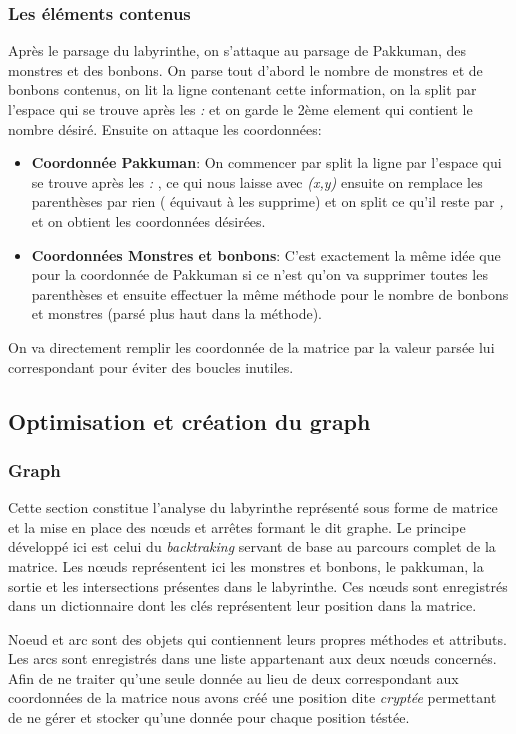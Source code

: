 \documentclass[12pt, oneside]{article}
\begin{document}
\subsubsection{Les éléments contenus}
Après le parsage du labyrinthe, on s'attaque au parsage de Pakkuman, des monstres et des bonbons.
On parse tout d'abord le nombre de monstres et de bonbons contenus, on lit la ligne contenant cette information, on la split par l'espace qui se trouve après les \emph{:} et on garde le 2ème element qui contient le nombre désiré.
Ensuite on attaque les coordonnées:

\begin{itemize}
\item 
\textbf{Coordonnée Pakkuman}: On commencer par split la ligne par l'espace qui se trouve après les \emph{:} , ce qui nous laisse avec \emph{(x,y)} ensuite on remplace les parenthèses par rien ( équivaut à les supprime) et on split ce qu'il reste par \emph{,} et on obtient les coordonnées désirées.
\item
\textbf{Coordonnées Monstres et bonbons}: C'est exactement la même idée que pour la coordonnée de Pakkuman si ce n'est qu'on va supprimer toutes les parenthèses et ensuite effectuer la même méthode pour le nombre de bonbons et monstres (parsé plus haut dans la méthode).

\end{itemize}
On va directement remplir les coordonnée de la matrice par la valeur parsée lui correspondant pour éviter des boucles inutiles.

\subsection{Optimisation et création du graph}
\subsubsection{Graph}
Cette section constitue l’analyse du labyrinthe représenté sous forme de matrice et la mise en place des nœuds et arrêtes formant le dit graphe.
Le principe développé ici est celui du \emph{backtraking}  servant de base au parcours complet de la matrice. Les nœuds représentent ici les monstres et bonbons, le pakkuman, la sortie et les intersections présentes dans le labyrinthe. Ces nœuds sont enregistrés dans un dictionnaire dont les clés représentent leur position dans la matrice.

Noeud et arc sont des objets qui contiennent leurs propres méthodes et attributs. Les arcs sont enregistrés dans une liste appartenant aux deux nœuds concernés. 
Afin de ne traiter qu’une seule donnée au lieu de deux correspondant aux coordonnées de la matrice nous avons créé une position dite \emph{cryptée} permettant de ne gérer et stocker qu’une donnée pour chaque position téstée.
\end{document}

